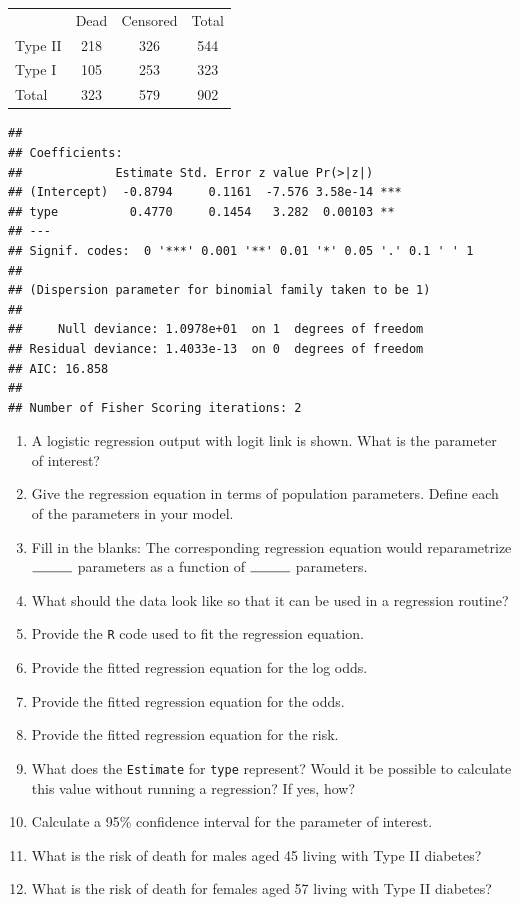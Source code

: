 \documentclass[landscape,twocolumn,letterpaper,9pt,reqno]{article}\usepackage[]{graphicx}\usepackage[]{color}
\newenvironment{knitrout}{}{} %
\newcommand{\compresslist}{ %
	\setlength{\itemsep}{1pt}
	\setlength{\parskip}{0pt}
	\setlength{\parsep}{0pt}
}
\begin{document}
\begin{table}[h]
	\centering
	\begin{tabular}{lcc|c}
		& Dead &  Censored & Total\\
		Type II & 218 & 326 & 544 \\
		Type I & 105 & 253 & 323 \\
		\hline
		Total & 323 & 579 & 902
	\end{tabular}
\end{table}


\begin{knitrout}
\color{fgcolor}
\begin{verbatim}
## 
## Coefficients:
##             Estimate Std. Error z value Pr(>|z|)    
## (Intercept)  -0.8794     0.1161  -7.576 3.58e-14 ***
## type          0.4770     0.1454   3.282  0.00103 ** 
## ---
## Signif. codes:  0 '***' 0.001 '**' 0.01 '*' 0.05 '.' 0.1 ' ' 1
## 
## (Dispersion parameter for binomial family taken to be 1)
## 
##     Null deviance: 1.0978e+01  on 1  degrees of freedom
## Residual deviance: 1.4033e-13  on 0  degrees of freedom
## AIC: 16.858
## 
## Number of Fisher Scoring iterations: 2
\end{verbatim}

\end{knitrout}

\begin{enumerate}\compresslist
	\item A logistic regression output with logit link is shown. What is the parameter of interest?
	\item Give the regression equation in terms of population parameters. Define each of the parameters in your model.
	\item Fill in the blanks: The corresponding regression equation would reparametrize $\rule{1cm}{0.15mm}$ parameters as a function of $\rule{1cm}{0.15mm}$ parameters.
	\item What should the data look like so that it can be used in a regression routine?
	\item Provide the \texttt{R} code used to fit the regression equation.
	\item Provide the fitted regression equation for the log odds. 
	\item Provide the fitted regression equation for the odds. 
	\item Provide the fitted regression equation for the risk. 
	\item What does the \texttt{Estimate} for \texttt{type} represent? Would it be possible to calculate this value without running a regression? If yes, how?
	\item Calculate a 95\% confidence interval for the parameter of interest. 
	\item What is the risk of death for males aged 45 living with Type II diabetes? 
	\item What is the risk of death for females aged 57 living with Type II diabetes? 
\end{enumerate}
\end{document}
